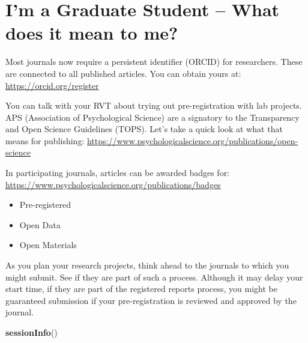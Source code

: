 \documentclass[
  english,
]{book}
\newenvironment{Shaded}{\begin{snugshade}}{\end{snugshade}}
\newcommand{\KeywordTok}[1]{\textcolor[rgb]{0.13,0.29,0.53}{\textbf{#1}}}
\newcommand{\NormalTok}[1]{#1}
\providecommand{\tightlist}{%
  \setlength{\itemsep}{0pt}\setlength{\parskip}{0pt}}
\begin{document}
\hypertarget{im-a-graduate-student-what-does-it-mean-to-me}{%
\section{I'm a Graduate Student -- What does it mean to me?}\label{im-a-graduate-student-what-does-it-mean-to-me}}

Most journals now require a persistent identifier (ORCID) for researchers. These are connected to all published articles. You can obtain yours at: \url{https://orcid.org/register}

You can talk with your RVT about trying out pre-registration with lab projects.
APS (Association of Psychological Science) are a signatory to the Transparency and Open Science Guidelines (TOPS). Let's take a quick look at what that means for publishing:
\url{https://www.psychologicalscience.org/publications/open-science}

In participating journals, articles can be awarded badges for:
\url{https://www.psychologicalscience.org/publications/badges}

\begin{itemize}
\tightlist
\item
  Pre-registered
\item
  Open Data
\item
  Open Materials
\end{itemize}

As you plan your research projects, think ahead to the journals to which you might submit. See if they are part of such a process. Although it may delay your start time, if they are part of the registered reports process, you might be guaranteed submission if your pre-registration is reviewed and approved by the journal.

\begin{Shaded}
\begin{Highlighting}[]
\KeywordTok{sessionInfo}\NormalTok{()}
\end{Highlighting}
\end{Shaded}
\end{document}
